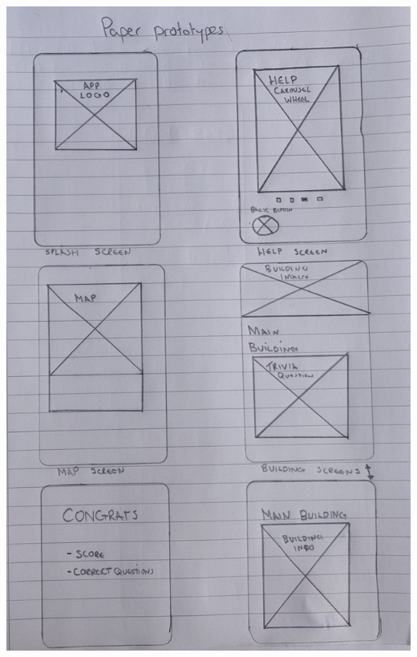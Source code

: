 \documentclass[a4,10pt,twocolumn]{article}
\begin{document}
\noindent\includegraphics[width=\columnwidth]{paperPrototype3.jpg}
\end{document}
